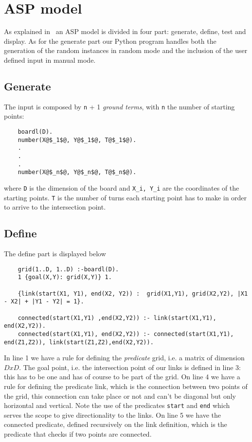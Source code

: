 \section{ASP model}
As explained in~\cite{ClingoGuide} an ASP model is divided in four part: generate, define, test and display.
As for the generate part our Python program handles both the generation of the random instances in random mode and the inclusion of the user defined input in manual mode.
\subsection{Generate}
The input is composed by \texttt{n} + 1 \emph{ground terms}, with \texttt{n} the number of starting points:
\begin{verbatim}
    boardl(D).
    number(X@$_1$@, Y@$_1$@, T@$_1$@).
    .
    .
    .
    number(X@$_n$@, Y@$_n$@, T@$_n$@).
\end{verbatim}
where \texttt{D} is the dimension of the board and \texttt{X_i, Y_i} are the coordinates of the starting points. \texttt{T} is the number of turns each starting point has to make in order to arrive to the intersection point.

\subsection{Define}\label{sec:asp-define}
The define part is displayed below
\begin{verbatim}
    grid(1..D, 1..D) :-boardl(D).
    1 {goal(X,Y): grid(X,Y)} 1.
    
    {link(start(X1, Y1), end(X2, Y2)) :  grid(X1,Y1), grid(X2,Y2), |X1 - X2| + |Y1 - Y2| = 1}. 
    
    connected(start(X1,Y1) ,end(X2,Y2)) :- link(start(X1,Y1), end(X2,Y2)).
    connected(start(X1,Y1), end(X2,Y2)) :- connected(start(X1,Y1), end(Z1,Z2)), link(start(Z1,Z2),end(X2,Y2)). 
\end{verbatim}

In line 1 we have a rule for defining the \emph{predicate} grid, i.e. a matrix of dimension $DxD$. The goal point, i.e. the intersection point of our links is defined in line 3: this has to be one and has of course to be part of the grid.
On line 4 we have a rule for defining the predicate link, which is the connection between two points of the grid, this connection can take place or not and can't be diagonal but only horizontal and vertical. Note the use of the predicates \texttt{start} and \texttt{end} which serves the scope to give directionality to the links.
On line 5 we have the connected predicate, defined recursively on the link definition, which is the predicate that checks if two points are connected.
